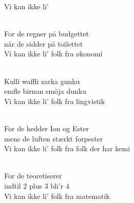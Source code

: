 \begin{song}{Vi kan ikke li'}
  \begin{SBVerse}
    \\
    For de regner på budgettet\\
    når de sidder på toilettet\\
    Vi kan ikke li' folk fra økonomi
  \end{SBVerse}

  \begin{SBVerse}
    \\
    Kulli waffli zarka gunku\\
    emfle birnan smöja dunku\\
    Vi kan ikke li' folk fra lingvistik
  \end{SBVerse}

  \begin{SBVerse}
    \\
    For de hedder Ion og Ester\\
    mens de luften stærkt forpester\\
    Vi kan ikke li' folk fra folk der har kemi
  \end{SBVerse}

 \begin{SBVerse}
    \\
    For de teoretiserer\\
    indtil $2$ plus $3$ bli'r $4$\\
    Vi kan ikke li' folk fra matematik
  \end{SBVerse}





\end{song}

